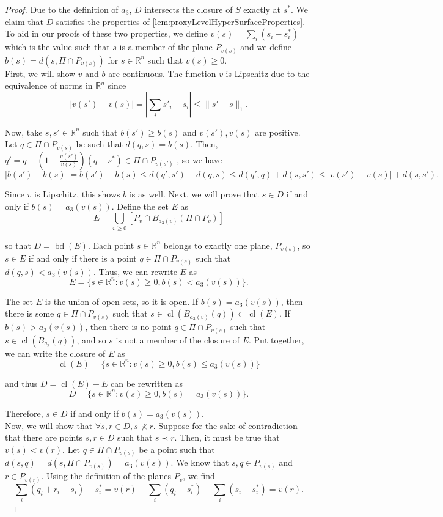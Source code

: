 \documentclass{article}
\DeclareMathOperator*{\cl}{cl}
\DeclareMathOperator*{\bd}{bd}
\begin{document}
\begin{proof}
Due to the definition of $a_3$, $D$ intersects the closure of $S$ exactly at $s^*$. We claim that $D$ satisfies the properties of \cref{lem:proxyLevelHyperSurfaceProperties}. To aid in our proofs of these two properties, we define $v(s) = \sum_i (s_i - s^*_i)$ which is the value such that $s$ is a member of the plane $P_{v(s)}$ and we define $b(s) = d(s, \Pi\cap P_{v(s)})$ for $s \in \mathbb R^n$ such that $v(s) \geq 0$.\\

First, we will show $v$ and $b$ are continuous. The function $v$ is Lipschitz due to the equivalence of norms in $\mathbb R^n$ since
$$|v(s') - v(s)| = \left| \sum_i s'_i - s_i\right| \leq  \| s' - s \|_1.$$

Now, take $s, s' \in \mathbb R^n$ such that $b(s') \geq b(s)$ and $v(s'), v(s)$ are positive. Let $q \in \Pi \cap P_{v(s)}$ be such that $d(q,s) = b(s)$. Then, $q' = q - (1 - \frac{v(s')}{v(s)})(q-s^*) \in \Pi \cap P_{v(s')}$ , so we have
$$|b(s') - b(s)| = b(s') - b(s) \leq d(q', s') - d(q, s) \leq d(q', q) + d(s, s') \leq |v(s') - v(s)| + d(s, s').$$

Since $v$ is Lipschitz, this shows $b$ is as well. Next, we will prove that $s \in D$ if and only if $b(s) = a_3(v(s))$. Define the set $E$ as
$$E = \bigcup_{v \geq 0} \left[ P_v \cap B_{a_3(v)}(\Pi \cap P_v) \right]$$ 

so that $D = \bd(E)$. Each point $s \in \mathbb R^n$ belongs to exactly one plane, $P_{v(s)}$, so $s \in E$ if and only if there is a point $q \in \Pi \cap P_{v(s)}$ such that $d(q, s) < a_3(v(s))$. Thus, we can rewrite $E$ as 
$$E = \{s \in \mathbb R^n : v(s) \geq 0, b(s) < a_3(v(s))\}.$$

The set $E$ is the union of open sets, so it is open. If $b(s) = a_3(v(s))$, then there is some $q \in \Pi \cap P_{v(s)}$ such that $s \in \cl(B_{a_3(v)}(q)) \subset \cl(E)$. If $b(s) > a_3(v(s))$, then there is no point $q \in \Pi \cap P_{v(s)}$ such that $s \in \cl(B_{a_3}(q))$, and so $s$ is not a member of the closure of $E$. Put together, we can write the closure of $E$ as
$$\cl(E) = \{s \in \mathbb R^n : v(s) \geq 0, b(s) \leq a_3(v(s))\}$$

and thus $D = \cl(E) - E$ can be rewritten as
$$D = \{s \in \mathbb R^n : v(s) \geq 0, b(s) = a_3(v(s))\}.$$

Therefore, $s \in D$ if and only if $b(s) = a_3(v(s))$.\\

Now, we will show that $\forall s, r \in D, s \not\prec r$. Suppose for the sake of contradiction that there are points $s, r \in D$ such that $s \prec r$. Then, it must be true that $v(s) < v(r)$. Let $q \in \Pi \cap P_{v(s)}$ be a point such that $d(s, q) = d(s, \Pi \cap P_{v(s)}) = a_3(v(s))$. We know that $s, q \in P_{v(s)}$ and $r \in P_{v(r)}$. Using the definition of the planes $P_v$, we find
$$\sum_i (q_i + r_i - s_i) - s_i^* = v(r) + \sum_i (q_i - s_i^*) - \sum_i (s_i-s_i^*) = v(r).$$


\end{proof}
\end{document}
